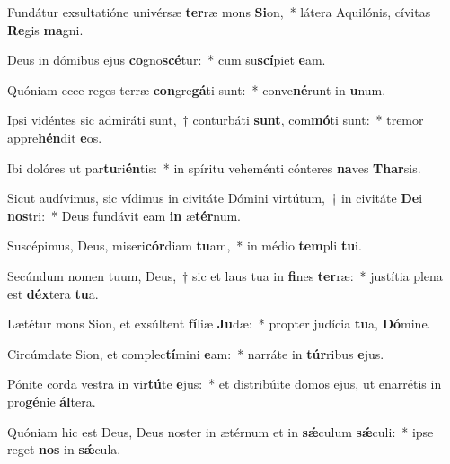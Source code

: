 \item Fundátur exsultatióne univérsæ \textbf{ter}ræ mons \textbf{Si}on,~* látera Aquilónis, cívitas \textbf{Re}gis \textbf{ma}gni.
\item Deus in dómibus ejus \textbf{co}gno\textbf{scé}tur:~* cum su\textbf{scí}piet \textbf{e}am.
\item Quóniam ecce reges terræ \textbf{con}gre\textbf{gá}ti sunt:~* conve\textbf{né}runt in \textbf{u}num.
\item Ipsi vidéntes sic admiráti sunt,~† conturbáti \textbf{sunt}, com\textbf{mó}ti sunt:~* tremor appre\textbf{hén}dit \textbf{e}os.
\item Ibi dolóres ut par\textbf{tu}ri\textbf{én}tis:~* in spíritu veheménti cónteres \textbf{na}ves \textbf{Thar}sis.
\item Sicut audívimus, sic vídimus in civitáte Dómini virtútum,~† in civitáte \textbf{De}i \textbf{nos}tri:~* Deus fundávit eam \textbf{in} æ\textbf{tér}num.
\item Suscépimus, Deus, miseri\textbf{cór}diam \textbf{tu}am,~* in médio \textbf{tem}pli \textbf{tu}i.
\item Secúndum nomen tuum, Deus,~† sic et laus tua in \textbf{fi}nes \textbf{ter}ræ:~* justítia plena est \textbf{déx}tera \textbf{tu}a.
\item Lætétur mons Sion, et exsúltent \textbf{fí}liæ \textbf{Ju}dæ:~* propter judícia \textbf{tu}a, \textbf{Dó}mine.
\item Circúmdate Sion, et complec\textbf{tí}mini \textbf{e}am:~* narráte in \textbf{túr}ribus \textbf{e}jus.
\item Pónite corda vestra in vir\textbf{tú}te \textbf{e}jus:~* et distribúite domos ejus, ut enarrétis in pro\textbf{gé}nie \textbf{ál}tera.
\item Quóniam hic est Deus, Deus noster in ætérnum et in \textbf{sǽ}culum \textbf{sǽ}culi:~* ipse reget \textbf{nos} in \textbf{sǽ}cula.
